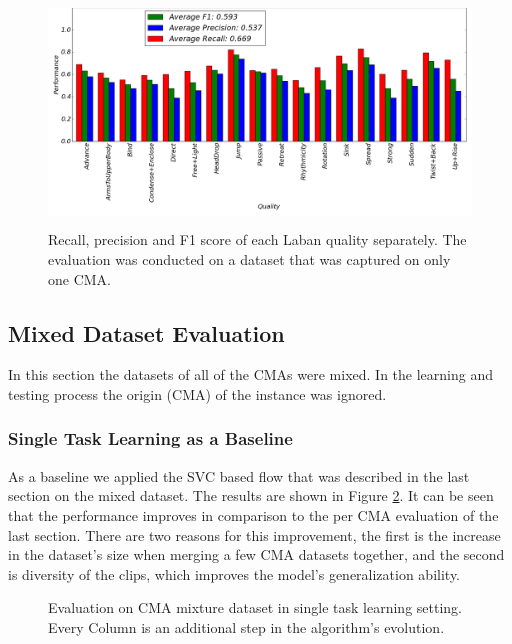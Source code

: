 \documentclass[11pt,twocolumn,varwidth=true,a4paper,fleqn]{article}
\begin{document}
\begin{figure}
	\centering
	\includegraphics[width=\textwidth, height=60mm]{oneCMAFinalWithoutTitle.png}
	\caption{Recall, precision and F1 score of each Laban quality separately. The
	evaluation was conducted on a dataset that was captured on only one CMA.}
	\label{oneCMAFinal}
\end{figure}
	
\subsection{Mixed Dataset Evaluation}
	In this section the datasets of all of the CMAs were mixed. In the learning
	and testing process the origin (CMA) of the instance was ignored. 
\subsubsection{Single Task Learning as a Baseline}
As a baseline we applied the SVC based flow that was described in the last
section on the mixed dataset. The results are shown in Figure \ref{mixedCMASummary}.
It can be seen that the performance improves in comparison to the
per CMA evaluation of the last section. There are two reasons for this
improvement, the first is the increase in the dataset's size when merging a few
CMA datasets together, and the second is diversity of the clips, which improves
the model's generalization ability.


\begin{figure}[ht!]
\centering
{}
\caption{Evaluation on CMA mixture dataset in single task learning
		setting. Every Column is an additional step in the algorithm's evolution.}
\label{mixedCMASummary}
\end{figure}
\end{document}
